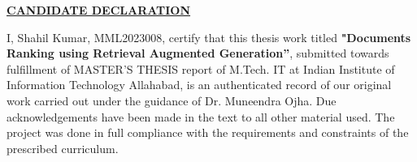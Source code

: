 
\begin{center}
{\underline{\bf\Large CANDIDATE DECLARATION }}\\
\par\vspace{5mm}
\end{center}
\noindent I, Shahil Kumar, MML2023008, certify that this thesis work titled
\textbf{"Documents Ranking using Retrieval Augmented Generation”}, submitted
towards fulfillment of MASTER'S THESIS report of M.Tech. IT at Indian Institute of
Information Technology Allahabad, is an authenticated record of our original work carried out under the
guidance of Dr. Muneendra Ojha. Due acknowledgements have been made in the text to all other
material used. The project was done in full compliance with the requirements and constraints of the prescribed
curriculum.

\vspace{25mm}

